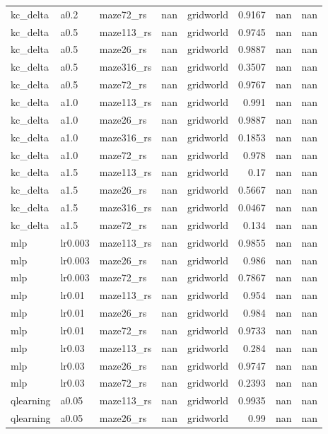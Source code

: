 \begin{table}[t]
\begin{tabular}{lllrrrrr}
kc\_delta & a0.2 & maze72\_rs & nan & gridworld & 0.9167 & nan & nan \\
kc\_delta & a0.5 & maze113\_rs & nan & gridworld & 0.9745 & nan & nan \\
kc\_delta & a0.5 & maze26\_rs & nan & gridworld & 0.9887 & nan & nan \\
kc\_delta & a0.5 & maze316\_rs & nan & gridworld & 0.3507 & nan & nan \\
kc\_delta & a0.5 & maze72\_rs & nan & gridworld & 0.9767 & nan & nan \\
kc\_delta & a1.0 & maze113\_rs & nan & gridworld & 0.991 & nan & nan \\
kc\_delta & a1.0 & maze26\_rs & nan & gridworld & 0.9887 & nan & nan \\
kc\_delta & a1.0 & maze316\_rs & nan & gridworld & 0.1853 & nan & nan \\
kc\_delta & a1.0 & maze72\_rs & nan & gridworld & 0.978 & nan & nan \\
kc\_delta & a1.5 & maze113\_rs & nan & gridworld & 0.17 & nan & nan \\
kc\_delta & a1.5 & maze26\_rs & nan & gridworld & 0.5667 & nan & nan \\
kc\_delta & a1.5 & maze316\_rs & nan & gridworld & 0.0467 & nan & nan \\
kc\_delta & a1.5 & maze72\_rs & nan & gridworld & 0.134 & nan & nan \\
mlp & lr0.003 & maze113\_rs & nan & gridworld & 0.9855 & nan & nan \\
mlp & lr0.003 & maze26\_rs & nan & gridworld & 0.986 & nan & nan \\
mlp & lr0.003 & maze72\_rs & nan & gridworld & 0.7867 & nan & nan \\
mlp & lr0.01 & maze113\_rs & nan & gridworld & 0.954 & nan & nan \\
mlp & lr0.01 & maze26\_rs & nan & gridworld & 0.984 & nan & nan \\
mlp & lr0.01 & maze72\_rs & nan & gridworld & 0.9733 & nan & nan \\
mlp & lr0.03 & maze113\_rs & nan & gridworld & 0.284 & nan & nan \\
mlp & lr0.03 & maze26\_rs & nan & gridworld & 0.9747 & nan & nan \\
mlp & lr0.03 & maze72\_rs & nan & gridworld & 0.2393 & nan & nan \\
qlearning & a0.05 & maze113\_rs & nan & gridworld & 0.9935 & nan & nan \\
qlearning & a0.05 & maze26\_rs & nan & gridworld & 0.99 & nan & nan \\

\end{tabular}
\end{table}
